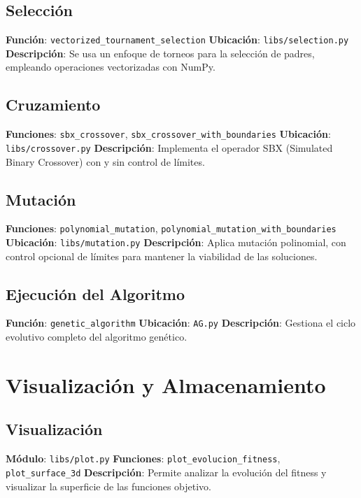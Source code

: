 \subsection{Selecci\'on}
\textbf{Funci\'on}: \texttt{vectorized\_tournament\_selection}  
\textbf{Ubicaci\'on}: \texttt{libs/selection.py}  
\textbf{Descripci\'on}: Se usa un enfoque de torneos para la selecci\'on de padres, empleando operaciones vectorizadas con NumPy.

\subsection{Cruzamiento}
\textbf{Funciones}: \texttt{sbx\_crossover}, \texttt{sbx\_crossover\_with\_boundaries}  
\textbf{Ubicaci\'on}: \texttt{libs/crossover.py}  
\textbf{Descripci\'on}: Implementa el operador SBX (Simulated Binary Crossover) con y sin control de l\'imites.

\subsection{Mutaci\'on}
\textbf{Funciones}: \texttt{polynomial\_mutation}, \texttt{polynomial\_mutation\_with\_boundaries}  
\textbf{Ubicaci\'on}: \texttt{libs/mutation.py}  
\textbf{Descripci\'on}: Aplica mutaci\'on polinomial, con control opcional de l\'imites para mantener la viabilidad de las soluciones.

\subsection{Ejecuci\'on del Algoritmo}
\textbf{Funci\'on}: \texttt{genetic\_algorithm}  
\textbf{Ubicaci\'on}: \texttt{AG.py}  
\textbf{Descripci\'on}: Gestiona el ciclo evolutivo completo del algoritmo gen\'etico.

\section{Visualizaci\'on y Almacenamiento}

\subsection{Visualizaci\'on}
\textbf{M\'odulo}: \texttt{libs/plot.py}  
\textbf{Funciones}: \texttt{plot\_evolucion\_fitness}, \texttt{plot\_surface\_3d}  
\textbf{Descripci\'on}: Permite analizar la evoluci\'on del fitness y visualizar la superficie de las funciones objetivo.

